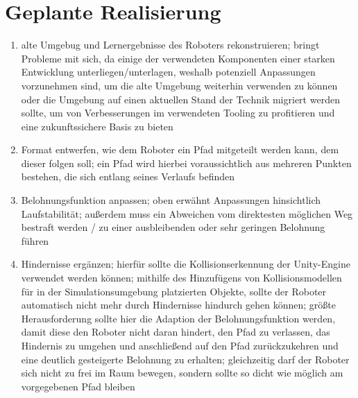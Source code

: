 \section{Geplante Realisierung}
\begin{enumerate}
    \item alte Umgebug und Lernergebnisse des Roboters rekonstruieren; bringt Probleme mit sich, da einige der verwendeten Komponenten einer starken Entwicklung unterliegen/unterlagen, weshalb potenziell Anpassungen vorzunehmen sind, um die alte Umgebung weiterhin verwenden zu können oder die Umgebung auf einen aktuellen Stand der Technik migriert werden sollte, um von Verbesserungen im verwendeten Tooling zu profitieren und eine zukunftssichere Basis zu bieten
    \item Format entwerfen, wie dem Roboter ein Pfad mitgeteilt werden kann, dem dieser folgen soll; ein Pfad wird hierbei voraussichtlich aus mehreren Punkten bestehen, die sich entlang seines Verlaufs befinden
    \item Belohnungsfunktion anpassen; oben erwähnt Anpassungen hinsichtlich Laufstabilität; außerdem muss ein Abweichen vom direktesten möglichen Weg bestraft werden / zu einer ausbleibenden oder sehr geringen Belohnung führen
    \item Hindernisse ergänzen; hierfür sollte die Kollisionserkennung der Unity-Engine verwendet werden können; mithilfe des Hinzufügens von Kollisionsmodellen für in der Simulationsumgebung platzierten Objekte, sollte der Roboter automatisch nicht mehr durch Hindernisse hindurch gehen können; größte Herausforderung sollte hier die Adaption der Belohnungsfunktion werden, damit diese den Roboter nicht daran hindert, den Pfad zu verlassen, das Hindernis zu umgehen und anschließend auf den Pfad zurückzukehren und eine deutlich gesteigerte Belohnung zu erhalten; gleichzeitig darf der Roboter sich nicht zu frei im Raum bewegen, sondern sollte so dicht wie möglich am vorgegebenen Pfad bleiben
\end{enumerate}
